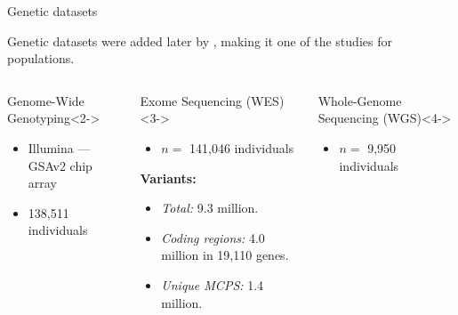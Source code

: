 \begin{frame}{Genetic datasets}

    Genetic datasets were added later by \textcite{ziyatdinov2023}, making it one of the  studies for  populations.

    {\footnotesize
    \begin{columns}[t]

        \begin{column}{0.3\textwidth}
            \begin{block}{Genome-Wide Genotyping}<2->
                \begin{itemize}
                    \item Illumina --- GSAv2 chip array
                    \item 138,511 individuals
                \end{itemize}
            \end{block}
        \end{column}

        \begin{column}{0.3\textwidth}
            \begin{block}{Exome Sequencing (WES)}<3->
                \begin{itemize}
                    \item $n =$ 141,046 individuals
                \end{itemize}

                \textbf{Variants:}
                \begin{itemize}
                    \item \textit{Total:} 9.3 million.
                    \item \textit{Coding regions:} 4.0 million in 19,110 genes.
                    \item \textit{Unique MCPS:} 1.4 million.
                \end{itemize}

            \end{block}        
        \end{column}

        \begin{column}{0.3\textwidth}
            \begin{block}{Whole-Genome Sequencing (WGS)}<4->
                \begin{itemize}
                    \item $n =$ 9,950 individuals
                \end{itemize}
            \end{block}
        \end{column}
    \end{columns}
    }

\end{frame}

